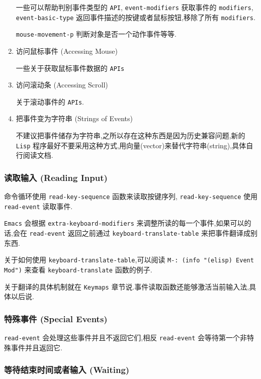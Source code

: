 \documentclass[11pt]{article}
\begin{document}
\begin{enumerate}
一些可以帮助判别事件类型的 \texttt{API}, \texttt{event-modifiers} 获取事件的 \texttt{modifiers}, \texttt{event-basic-type} 返回事件描述的按键或者鼠标按钮,移除了所有 \texttt{modifiers}.

\texttt{mouse-movement-p} 判断对象是否一个动作事件等等.


\item 访问鼠标事件 (Accessing Mouse)
\label{sec:orgb6a82c1}

一些关于获取鼠标事件数据的 \texttt{APIs}


\item 访问滚动条 (Accessing Scroll)
\label{sec:org5b4553b}

关于滚动事件的 \texttt{APIs}.


\item 把事件变为字符串 (Strings of Events)
\label{sec:org2d84bf9}

不建议把事件储存为字符串,之所以存在这种东西是因为历史兼容问题,新的 \texttt{Lisp} 程序最好不要采用这种方式,用向量(vector)来替代字符串(string),具体自行阅读文档.
\end{enumerate}


\subsubsection{读取输入 (Reading Input)}
\label{sec:orge7b57aa}

命令循环使用 \texttt{read-key-sequence} 函数来读取按键序列, \texttt{read-key-sequence} 使用 \texttt{read-event} 读取事件.

\texttt{Emacs} 会根据 \texttt{extra-keyboard-modifiers} 来调整所读的每一个事件,如果可以的话,会在 \texttt{read-event} 返回之前通过 \texttt{keyboard-translate-table} 来把事件翻译成别东西.

关于如何使用 \texttt{keyboard-translate-table},可以阅读 \texttt{M-: (info "(elisp) Event Mod")} 来查看 \texttt{keyboard-translate} 函数的例子.

关于翻译的具体机制就在 \texttt{Keymaps} 章节说.事件读取函数还能够激活当前输入法,具体以后说.


\subsubsection{特殊事件 (Special Events)}
\label{sec:org92f61f1}

\texttt{read-event} 会处理这些事件并且不返回它们,相反 \texttt{read-event} 会等待第一个非特殊事件并且返回它.


\subsubsection{等待结束时间或者输入 (Waiting)}
\label{sec:orgde0ba88}
\end{document}
